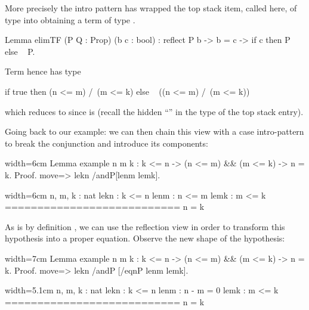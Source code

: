More precisely the  intro pattern has wrapped the top
stack item, called  here, of type  into
 obtaining a term of type
.

\begin{coq}{}{}
Lemma elimTF (P Q : Prop) (b c : bool) :
  reflect P b -> b = c -> if c then P else ~ P.
\end{coq}
Term  hence has type

\begin{coq}{}{}
if true then (n <= m) /\ (m <= k) else ~ ((n <= m) /\ (m <= k))
\end{coq}
which reduces to  since  is 
(recall the hidden ``'' in the type of the top stack entry).

Going back to  our example: we can then chain this view with a case
intro-pattern to break the conjunction and introduce its components:

\begin{coq}{}{width=6cm}
Lemma example n m k : k <= n ->
  (n <= m) && (m <= k) -> n = k.
Proof.
move=> lekn /andP[lenm lemk].
\end{coq}
\begin{coqout}{}{width=6cm}
n, m, k : nat
lekn : k <= n
lenm : n <= m
lemk : m <= k
===========================
n = k
\end{coqout}

As  is by definition , we can use the
reflection view
 in order to transform this hypothesis into a proper equation.
Observe the new shape of the  hypothesis:

\begin{coq}{}{width=7cm}
Lemma example n m k : k <= n ->
  (n <= m) && (m <= k) -> n = k.
Proof.
move=> lekn /andP [/eqnP lenm lemk].
\end{coq}
\begin{coqout}{}{width=5.1cm}
n, m, k : nat
lekn : k <= n
lenm : n - m = 0
lemk : m <= k
===========================
n = k
\end{coqout}


